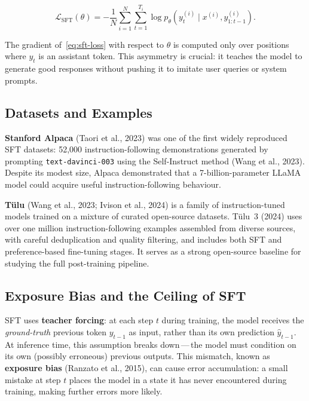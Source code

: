 \begin{equation}
\label{eq:sft-loss}
\mathcal{L}_{\mathrm{SFT}}(\theta) = -\frac{1}{N}\sum_{i=1}^{N}\sum_{t=1}^{T_i} \log p_\theta\!\left(y_t^{(i)} \mid x^{(i)}, y_{1:t-1}^{(i)}\right).
\end{equation}

The gradient of~\eqref{eq:sft-loss} with respect to $\theta$ is computed only over positions where $y_t$ is an assistant token. This asymmetry is crucial: it teaches the model to generate good responses without pushing it to imitate user queries or system prompts.

\subsection{Datasets and Examples}

\textbf{Stanford Alpaca} (Taori et al., 2023) was one of the first widely reproduced SFT datasets: 52{,}000 instruction-following demonstrations generated by prompting \texttt{text-davinci-003} using the Self-Instruct method (Wang et al., 2023). Despite its modest size, Alpaca demonstrated that a 7-billion-parameter LLaMA model could acquire useful instruction-following behaviour.

\textbf{T\"{u}lu} (Wang et al., 2023; Ivison et al., 2024) is a family of instruction-tuned models trained on a mixture of curated open-source datasets. T\"{u}lu~3 (2024) uses over one million instruction-following examples assembled from diverse sources, with careful deduplication and quality filtering, and includes both SFT and preference-based fine-tuning stages. It serves as a strong open-source baseline for studying the full post-training pipeline.

\subsection{Exposure Bias and the Ceiling of SFT}

SFT uses \textbf{teacher forcing}: at each step $t$ during training, the model receives the \emph{ground-truth} previous token $y_{t-1}$ as input, rather than its own prediction $\hat{y}_{t-1}$. At inference time, this assumption breaks down\,---\,the model must condition on its own (possibly erroneous) previous outputs. This mismatch, known as \textbf{exposure bias} (Ranzato et al., 2015), can cause error accumulation: a small mistake at step $t$ places the model in a state it has never encountered during training, making further errors more likely.

